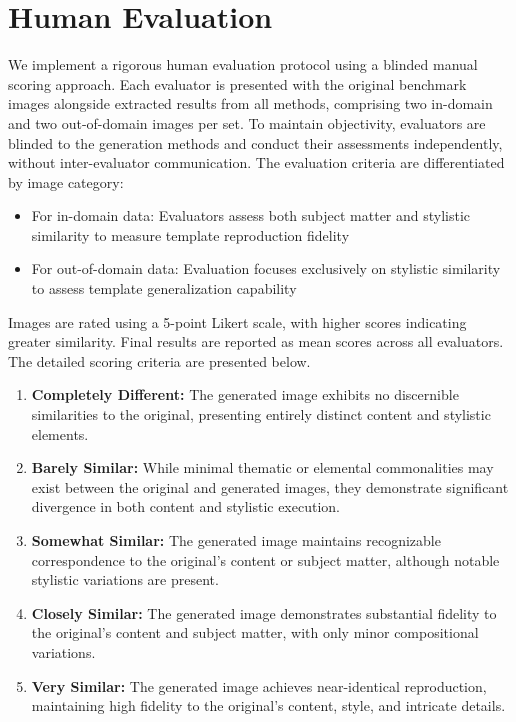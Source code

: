 \section{Human Evaluation} \label{app_he}
We implement a rigorous human evaluation protocol using a blinded manual scoring approach. Each evaluator is presented with the original benchmark images alongside extracted results from all methods, comprising two in-domain and two out-of-domain images per set. To maintain objectivity, evaluators are blinded to the generation methods and conduct their assessments independently, without inter-evaluator communication. The evaluation criteria are differentiated by image category:
\begin{itemize}
    \item For in-domain data: Evaluators assess both subject matter and stylistic similarity to measure template reproduction fidelity
    \item For out-of-domain data: Evaluation focuses exclusively on stylistic similarity to assess template generalization capability
\end{itemize}
Images are rated using a 5-point Likert scale, with higher scores indicating greater similarity. Final results are reported as mean scores across all evaluators. The detailed scoring criteria are presented below.
\begin{enumerate}
    \item \textbf{Completely Different:} The generated image exhibits no discernible similarities to the original, presenting entirely distinct content and stylistic elements.
    \item \textbf{Barely Similar:} While minimal thematic or elemental commonalities may exist between the original and generated images, they demonstrate significant divergence in both content and stylistic execution.
    \item \textbf{Somewhat Similar:} The generated image maintains recognizable correspondence to the original's content or subject matter, although notable stylistic variations are present.
    \item \textbf{Closely Similar:} The generated image demonstrates substantial fidelity to the original's content and subject matter, with only minor compositional variations.
    \item \textbf{Very Similar:} The generated image achieves near-identical reproduction, maintaining high fidelity to the original's content, style, and intricate details.
\end{enumerate}


